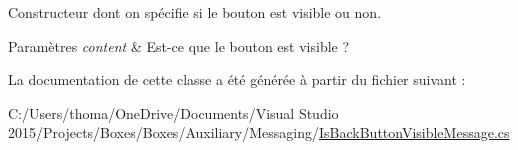Constructeur dont on spécifie si le bouton est visible ou non. 


\begin{DoxyParams}{Paramètres}
{\em content} & Est-\/ce que le bouton est visible ? \\
\hline
\end{DoxyParams}


La documentation de cette classe a été générée à partir du fichier suivant \+:\begin{DoxyCompactItemize}
\item 
C\+:/\+Users/thoma/\+One\+Drive/\+Documents/\+Visual Studio 2015/\+Projects/\+Boxes/\+Boxes/\+Auxiliary/\+Messaging/\hyperlink{_is_back_button_visible_message_8cs}{Is\+Back\+Button\+Visible\+Message.\+cs}\end{DoxyCompactItemize}
